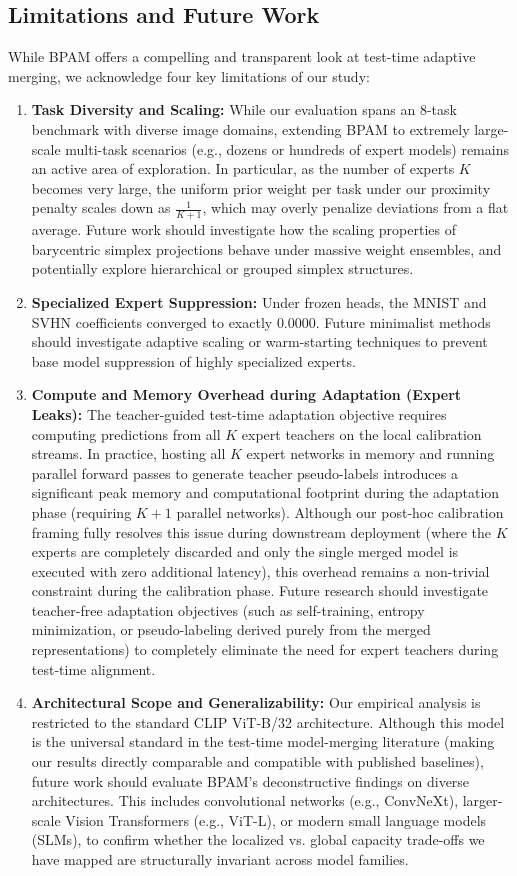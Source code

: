 \subsection{Limitations and Future Work}
While BPAM offers a compelling and transparent look at test-time adaptive merging, we acknowledge four key limitations of our study:
\begin{enumerate}
    \item {\bf Task Diversity and Scaling:} While our evaluation spans an 8-task benchmark with diverse image domains, extending BPAM to extremely large-scale multi-task scenarios (e.g., dozens or hundreds of expert models) remains an active area of exploration. In particular, as the number of experts $K$ becomes very large, the uniform prior weight per task under our proximity penalty scales down as $\frac{1}{K+1}$, which may overly penalize deviations from a flat average. Future work should investigate how the scaling properties of barycentric simplex projections behave under massive weight ensembles, and potentially explore hierarchical or grouped simplex structures.
    \item {\bf Specialized Expert Suppression:} Under frozen heads, the MNIST and SVHN coefficients converged to exactly $0.0000$. Future minimalist methods should investigate adaptive scaling or warm-starting techniques to prevent base model suppression of highly specialized experts.
    \item {\bf Compute and Memory Overhead during Adaptation (Expert Leaks):} The teacher-guided test-time adaptation objective requires computing predictions from all $K$ expert teachers on the local calibration streams. In practice, hosting all $K$ expert networks in memory and running parallel forward passes to generate teacher pseudo-labels introduces a significant peak memory and computational footprint during the adaptation phase (requiring $K+1$ parallel networks). Although our post-hoc calibration framing fully resolves this issue during downstream deployment (where the $K$ experts are completely discarded and only the single merged model is executed with zero additional latency), this overhead remains a non-trivial constraint during the calibration phase. Future research should investigate teacher-free adaptation objectives (such as self-training, entropy minimization, or pseudo-labeling derived purely from the merged representations) to completely eliminate the need for expert teachers during test-time alignment.
    \item {\bf Architectural Scope and Generalizability:} Our empirical analysis is restricted to the standard CLIP ViT-B/32 architecture. Although this model is the universal standard in the test-time model-merging literature (making our results directly comparable and compatible with published baselines), future work should evaluate BPAM's deconstructive findings on diverse architectures. This includes convolutional networks (e.g., ConvNeXt), larger-scale Vision Transformers (e.g., ViT-L), or modern small language models (SLMs), to confirm whether the localized vs. global capacity trade-offs we have mapped are structurally invariant across model families.
\end{enumerate}

